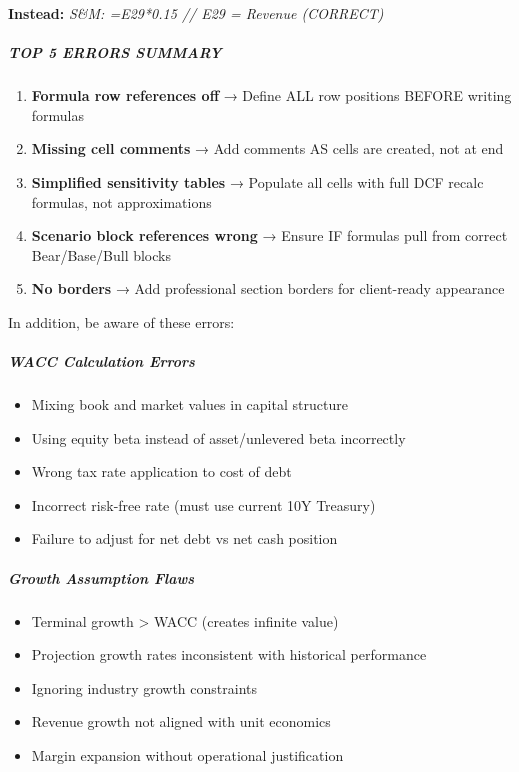 \documentclass[11pt]{article}
\begin{document}
\textbf{Instead:} \emph{S\&M: =E29*0.15    // E29 = Revenue (CORRECT)}


\subparagraph{TOP 5 ERRORS SUMMARY}\mbox{}\par

\begin{enumerate}[leftmargin=*,itemsep=2pt,topsep=2pt]
\item {} \textbf{Formula row references off} → Define ALL row positions BEFORE writing formulas
\item {} \textbf{Missing cell comments} → Add comments AS cells are created, not at end
\item {} \textbf{Simplified sensitivity tables} → Populate all cells with full DCF recalc formulas, not approximations
\item {} \textbf{Scenario block references wrong} → Ensure IF formulas pull from correct Bear/Base/Bull blocks
\item {} \textbf{No borders} → Add professional section borders for client-ready appearance
\end{enumerate}

In addition, be aware of these errors:


\subparagraph{WACC Calculation Errors}\mbox{}\par
\begin{itemize}[leftmargin=*,itemsep=2pt,topsep=2pt]
\item {} Mixing book and market values in capital structure
\item {} Using equity beta instead of asset/unlevered beta incorrectly
\item {} Wrong tax rate application to cost of debt
\item {} Incorrect risk-free rate (must use current 10Y Treasury)
\item {} Failure to adjust for net debt vs net cash position
\end{itemize}

\subparagraph{Growth Assumption Flaws}\mbox{}\par
\begin{itemize}[leftmargin=*,itemsep=2pt,topsep=2pt]
\item {} Terminal growth > WACC (creates infinite value)
\item {} Projection growth rates inconsistent with historical performance
\item {} Ignoring industry growth constraints
\item {} Revenue growth not aligned with unit economics
\item {} Margin expansion without operational justification
\end{itemize}
\end{document}
